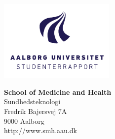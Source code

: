 

{}
\thispagestyle{empty}

\begin{minipage}[t]{0.48\textwidth}
\vspace*{-25pt}			%
\includegraphics[height=4cm]{figures/AAU-logo-stud-DK-RGB}
\end{minipage}
\hfill
\begin{minipage}[t]{0.48\textwidth}
{\small 
\textbf{School of Medicine and Health}\\
Sundhedsteknologi \\
Fredrik Bajersvej 7A \\
9000 Aalborg \\
http://www.smh.aau.dk}
\end{minipage}

\vspace*{1cm}

